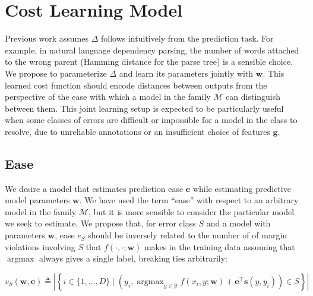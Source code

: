 \documentclass{article} %
\DeclareMathOperator*{\argmax}{argmax}
\begin{document}
\section{Cost Learning Model}
\label{costLearningModel}


Previous work assumes $\Delta$ follows intuitively from the prediction
task.  For example, in natural language dependency parsing, the number
of words attached to the wrong parent (Hamming distance for the parse
tree) is a sensible choice.  
We propose to parameterize $\Delta$ and
learn its parameters jointly with $\mathbf{w}$.  This learned cost
function should encode distances between outputs from the perspective
of the ease with which a model in the family $\mathcal{M}$
can distinguish between them.
This joint learning setup is expected to be particularly useful when
some classes of errors are difficult or impossible for a model in the
class to resolve, due to unreliable annotations or an insufficient
choice of features $\mathbf{g}$.


\subsection{Ease}
\label{sec:ease}
We desire a model that estimates prediction ease $\mathbf{e}$ while
estimating
predictive model parameters $\mathbf{w}$. 
We have used the term ``ease''
with respect to an arbitrary model in the family $\mathcal{M}$, but it
is more sensible to consider the particular model we seek to
estimate.  We propose that, for error class $S$ and a model with
parameters $\mathbf{w}$, ease $e_S$ should be inversely related to the
number of
of margin violations involving $S$ that $f(\cdot, \cdot; \mathbf{w})$ makes in the
training data assuming that $\argmax$ always gives a 
single label, breaking ties arbitrarily:

\begin{equation}
v_S (\mathbf{w}, \mathbf{e}) \triangleq \left|\left\{ i  \in \{1,\ldots, D\} \mid \left(y_i, \textstyle \argmax_{y \in \mathcal{Y}} f(x_i, y ; \mathbf{w}) +
\mathbf{e}^\top \mathbf{s}(y, y_i)\right) \in S\right\}\right| \label{eq:set}
\end{equation}
\end{document}

